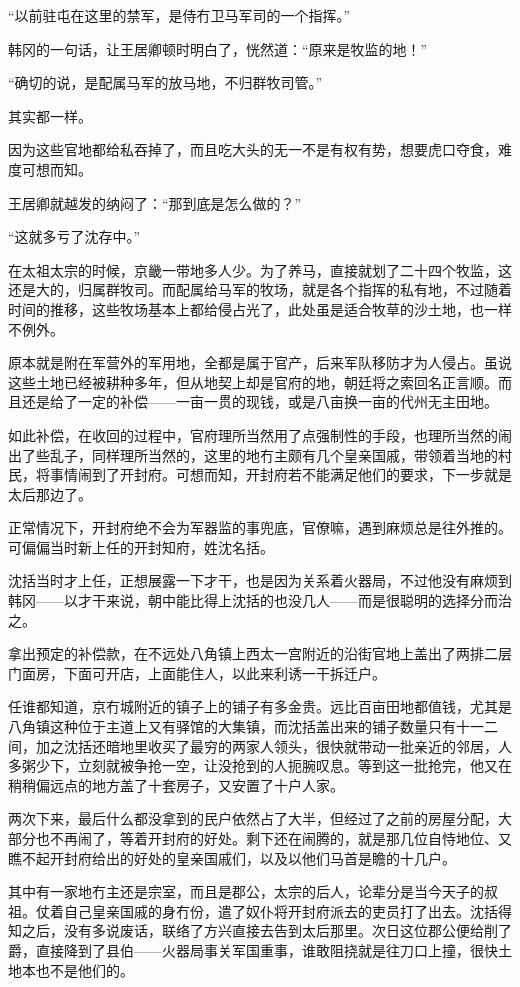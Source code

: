 “以前驻屯在这里的禁军，是侍冇卫马军司的一个指挥。”

韩冈的一句话，让王居卿顿时明白了，恍然道：“原来是牧监的地！”

“确切的说，是配属马军的放马地，不归群牧司管。”

其实都一样。

因为这些官地都给私吞掉了，而且吃大头的无一不是有权有势，想要虎口夺食，难度可想而知。

王居卿就越发的纳闷了：“那到底是怎么做的？”

“这就多亏了沈存中。”

在太祖太宗的时候，京畿一带地多人少。为了养马，直接就划了二十四个牧监，这还是大的，归属群牧司。而配属给马军的牧场，就是各个指挥的私有地，不过随着时间的推移，这些牧场基本上都给侵占光了，此处虽是适合牧草的沙土地，也一样不例外。

原本就是附在军营外的军用地，全都是属于官产，后来军队移防才为人侵占。虽说这些土地已经被耕种多年，但从地契上却是官府的地，朝廷将之索回名正言顺。而且还是给了一定的补偿——一亩一贯的现钱，或是八亩换一亩的代州无主田地。

如此补偿，在收回的过程中，官府理所当然用了点强制性的手段，也理所当然的闹出了些乱子，同样理所当然的，这里的地冇主颇有几个皇亲国戚，带领着当地的村民，将事情闹到了开封府。可想而知，开封府若不能满足他们的要求，下一步就是太后那边了。

正常情况下，开封府绝不会为军器监的事兜底，官僚嘛，遇到麻烦总是往外推的。可偏偏当时新上任的开封知府，姓沈名括。

沈括当时才上任，正想展露一下才干，也是因为关系着火器局，不过他没有麻烦到韩冈——以才干来说，朝中能比得上沈括的也没几人——而是很聪明的选择分而治之。

拿出预定的补偿款，在不远处八角镇上西太一宫附近的沿街官地上盖出了两排二层门面房，下面可开店，上面能住人，以此来利诱一干拆迁户。

任谁都知道，京冇城附近的镇子上的铺子有多金贵。远比百亩田地都值钱，尤其是八角镇这种位于主道上又有驿馆的大集镇，而沈括盖出来的铺子数量只有十一二间，加之沈括还暗地里收买了最穷的两家人领头，很快就带动一批亲近的邻居，人多粥少下，立刻就被争抢一空，让没抢到的人扼腕叹息。等到这一批抢完，他又在稍稍偏远点的地方盖了十套房子，又安置了十户人家。

两次下来，最后什么都没拿到的民户依然占了大半，但经过了之前的房屋分配，大部分也不再闹了，等着开封府的好处。剩下还在闹腾的，就是那几位自恃地位、又瞧不起开封府给出的好处的皇亲国戚们，以及以他们马首是瞻的十几户。

其中有一家地冇主还是宗室，而且是郡公，太宗的后人，论辈分是当今天子的叔祖。仗着自己皇亲国戚的身冇份，遣了奴仆将开封府派去的吏员打了出去。沈括得知之后，没有多说废话，联络了方兴直接去告到太后那里。次日这位郡公便给削了爵，直接降到了县伯——火器局事关军国重事，谁敢阻挠就是往刀口上撞，很快土地本也不是他们的。

